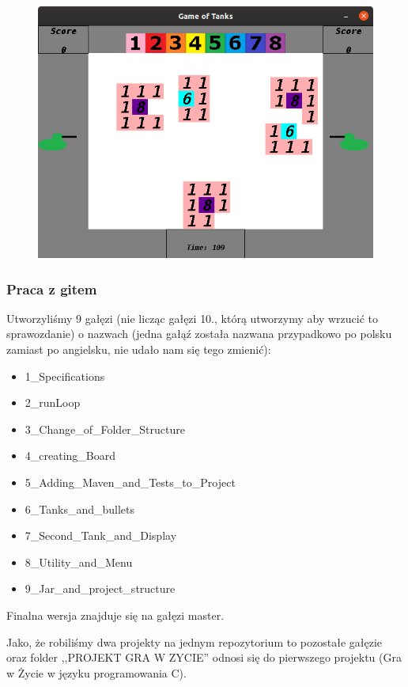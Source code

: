 \documentclass{article}
\begin{document}
\begin{figure} [hbt!]
    \includegraphics[width=15cm,center]{images/UbuntuApp.png}
\end{figure}


\subsubsection{Praca z gitem}
Utworzyliśmy 9 gałęzi (nie licząc gałęzi 10., którą utworzymy aby wrzucić to sprawozdanie) o nazwach (jedna gałąź została nazwana przypadkowo po polsku zamiast po angielsku, nie udało nam się tego zmienić):
\begin{itemize}
    \item 1\_Specifications  
    \item 2\_runLoop  
    \item 3\_Change\_of\_Folder\_Structure
    \item 4\_creating\_Board  
    \item 5\_Adding\_Maven\_and\_Tests\_to\_Project  
    \item 6\_Tanks\_and\_bullets  
    \item 7\_Second\_Tank\_and\_Display  
    \item 8\_Utility\_and\_Menu  
    \item 9\_Jar\_and\_project\_structure 
\end{itemize}
Finalna wersja znajduje się na gałęzi master.

Jako, że robiliśmy dwa projekty na jednym repozytorium to pozostałe gałęzie oraz folder ,,PROJEKT GRA W ZYCIE'' odnosi się do pierwszego projektu (Gra w Życie w języku programowania C).
\end{document}
